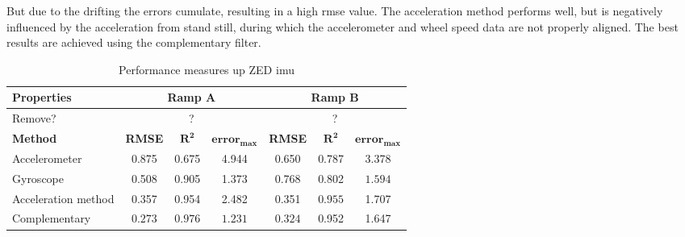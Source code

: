 But due to the drifting the errors cumulate, resulting in a high \gls{rmse} value.
The acceleration method performs well, but is negatively influenced by the acceleration from stand still, during which the accelerometer and wheel speed data are not properly aligned.
The best results are achieved using the complementary filter.
\begin{table}[htb]
	\centering
	\caption{Performance measures up ZED \gls{imu}}
	\label{tab:eval_table_imu_up}
	\begin{tabular}[t]{lcccccc}
		\toprule
		\textbf{Properties} & \multicolumn{3}{c}{\textbf{Ramp A}} & \multicolumn{3}{c}{\textbf{Ramp B}}                                                                                         \\
		\midrule
		Remove?             & \multicolumn{3}{c}{?}               & \multicolumn{3}{c}{?}                                                                                                       \\
		\hline
		\textbf{Method}     & \textbf{RMSE}                       & $\mathbf{R^2}$                      & $\mathbf{error_{max}}$ & \textbf{RMSE}    & $\mathbf{R^2}$   & $\mathbf{error_{max}}$ \\
		\cmidrule(lr){2-4}   \cmidrule(lr){5-7}
		Accelerometer       & 0.875                               & 0.675                               & 4.944                  & 0.650            & 0.787            & 3.378                  \\
		Gyroscope           & 0.508                               & 0.905                               & 1.373                  & 0.768            & 0.802            & $\mathbf{1.594  }$     \\
		Acceleration method & 0.357                               & 0.954                               & 2.482                  & 0.351            & $\mathbf{0.955}$ & 1.707                  \\
		Complementary       & $\mathbf{0.273} $                   & $\mathbf{0.976}$                    & $\mathbf{1.231 }$      & $\mathbf{0.324}$ & 0.952            & 1.647                  \\
		\bottomrule
	\end{tabular}
\end{table}
